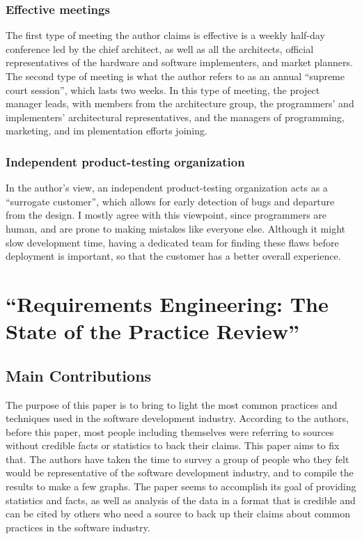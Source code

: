 \documentclass[letterpaper,12pt]{article}
\begin{document}
\subsubsection{Effective meetings}

The first type of meeting the author claims is effective is a weekly half-day
conference led by the chief architect, as well as all the architects, official
representatives of the hardware and software implementers, and market planners.
The second type of meeting is what the author refers to as an annual ``supreme
court session'', which lasts two weeks. In this type of meeting, the project
manager leads, with members from the architecture group,  the programmers' and
implementers' architectural representatives, and the managers of programming,
marketing, and im plementation efforts joining.

\subsubsection{Independent product-testing organization}

In the author's view, an independent product-testing organization acts  as a
``surrogate customer'', which allows for early detection of bugs and departure
from the design. I mostly agree with this viewpoint, since programmers are
human, and are prone to making mistakes like everyone else. Although it might
slow development time, having a dedicated team for finding these flaws before
deployment is important, so that the customer has a better overall experience.

\section{``Requirements Engineering: The State of the Practice Review''}

\subsection{Main Contributions}
The purpose of this paper is to bring to light the most common practices
and techniques used in the software development industry. According to
the authors, before this paper, most people including themselves were
referring to sources without credible facts or statistics to back their claims.
This paper aims to fix that. The authors have taken the time to
survey a group of people who they felt would be representative of the
software development industry, and to compile the results to make a few graphs.
The paper seems to accomplish its goal of providing statistics and facts, as well as
analysis of the data in a format that is credible and can be cited by others who
need a source to back up their claims about common practices in the software industry.
\end{document}
